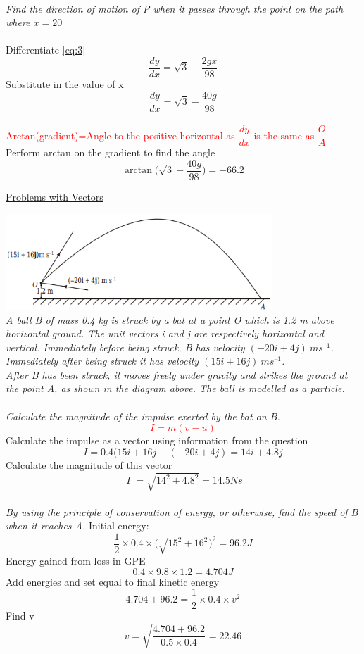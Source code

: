 \documentclass{article}[18pt]
\begin{document}
\\
\textit{Find the direction of motion of P when it passes through the point on the path where $x=20$}\\
\\
Differentiate \eqref{eq:3}
$$\frac{dy}{dx}=\sqrt{3}-\frac{2gx}{98}$$
Substitute in the value of x
$$\frac{dy}{dx}=\sqrt{3}-\frac{40g}{98}$$
\\
\textcolor{red}{Arctan(gradient)=Angle to the positive horizontal as $\dfrac{dy}{dx}$ is the same as $\dfrac{O}{A}$
}
\\
Perform arctan on the gradient to find the angle
$$\arctan\Big(\sqrt{3}-\frac{40g}{98}\Big)=-66.2$$
\newpage
\begin{center}
\underline{\Huge Problems with Vectors}
\end{center}
\includegraphics[width=10cm]{vector_problems.png}\\
\textit{A ball B of mass 0.4 kg is struck by a bat at a point O which is 1.2 m above horizontal ground.
The unit vectors i and j are respectively horizontal and vertical. Immediately before being
struck, B has velocity $(-20i+4j) \ ms^{–1}$. Immediately after being struck it has velocity $(15i+
16j) \ ms^{–1}$.\\
After B has been struck, it moves freely under gravity and strikes the ground at the point A, as
shown in the diagram above. The ball is modelled as a particle.}\\
\\
\textit{Calculate the magnitude of the impulse exerted by the bat on B. }
\textcolor{red}{$$I=m(v-u)$$}
Calculate the impulse as a vector using information from the question
$$I=0.4(15i+16j-(-20i+4j)=14i+4.8j$$
Calculate the magnitude of this vector
$$|I|=\sqrt{14^2+4.8^2}=14.5Ns$$
\\
\textit{By using the principle of conservation of energy, or otherwise, find the speed of B when
it reaches A.}
Initial energy:
$$\frac{1}{2}\times0.4\times\Big(\sqrt{15^2+16^2}\Big)^2=96.2J$$
Energy gained from loss in GPE
$$0.4\times9.8\times1.2=4.704J$$
Add energies and set equal to final kinetic energy
$$4.704+96.2=\frac{1}{2}\times0.4\times v^2$$
Find v
$$v=\sqrt{\frac{4.704+96.2}{0.5\times0.4}}=22.46$$
\end{document}
